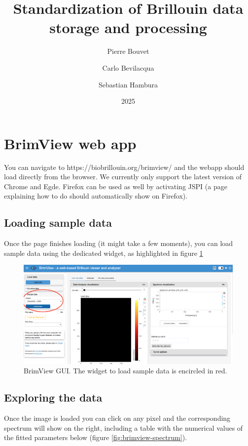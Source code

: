 \documentclass{article}
\title{Standardization of Brillouin data storage and processing}
\author{Pierre Bouvet \and Carlo Bevilacqua \and Sebastian Hambura}
\date{2025}
\begin{document}
\maketitle

\tableofcontents

\section{BrimView web app}

You can navigate to https://biobrillouin.org/brimview/ and the webapp should load directly from the browser. We currently only support the latest version of Chrome and Egde. Firefox can be used as well by activating JSPI (a page explaining how to do should automatically show on Firefox).

\subsection{Loading sample data}
Once the page finishes loading (it might take a few moments), you can load sample data using the dedicated widget, as highlighted in figure \ref{fig:brimview-sampledata}

\begin{figure}[H]
    \centering
    \includegraphics[width=\textwidth]{img/brimview-load_sample_data.png}
    \caption{BrimView GUI. The widget to load sample data is encircled in red.}
    \label{fig:brimview-sampledata}
\end{figure}

\subsection{Exploring the data}

Once the image is loaded you can click on any pixel and the corresponding spectrum will show on the right, including a table with the numerical values of the fitted parameters below (figure \ref{fig:brimview-spectrum}).
\end{document}
